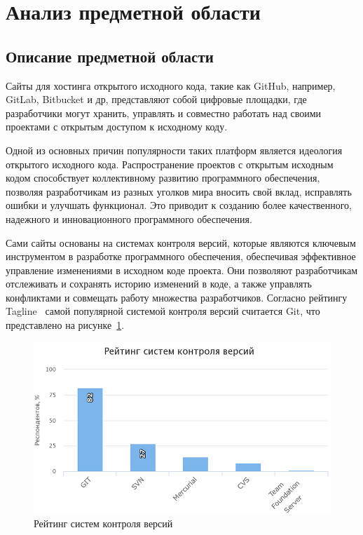 \newpage
\section{Анализ предметной области}
\label{sec:Background}
\subsection{Описание предметной области}
\label{subsec:Description}

Сайты для хостинга открытого исходного кода, такие как GitHub, например, GitLab, Bitbucket и др, представляют собой цифровые площадки, где разработчики могут хранить, управлять и совместно работать над своими проектами с открытым доступом к исходному коду.

Одной из основных причин популярности таких платформ является идеология открытого исходного кода. Распространение проектов с открытым исходным кодом способствует коллективному развитию программного обеспечения, позволяя разработчикам из разных уголков мира вносить свой вклад, исправлять ошибки и улучшать функционал. Это приводит к созданию более качественного, надежного и инновационного программного обеспечения.

Сами сайты основаны на системах контроля версий, которые являются ключевым инструментом в разработке программного обеспечения, обеспечивая эффективное управление изменениями в исходном коде проекта. Они позволяют разработчикам отслеживать и сохранять историю изменений в коде, а также управлять конфликтами и совмещать работу множества разработчиков. Согласно рейтингу Tagline~\cite{SCVRating} самой популярной системой контроля версий считается Git, что представлено на рисунке~\ref{ris:scvrating}.

\begin{figure}[h]
    \centering
    \includegraphics[width=0.9\linewidth]{pic/scvrating.png}
    \caption{Рейтинг систем контроля версий}
    \label{ris:scvrating}
\end{figure}
\vspace{1em}

